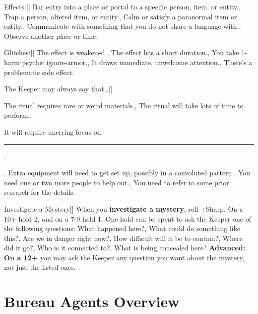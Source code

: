 \documentclass[10pt,oneside,landscape]{memoir}
\begin{document}
\begin{multicols}{3}
\begin{minipage}[t][0.75\textheight][t]{1\linewidth}
\begin{blurb*}{Effects:}[]
\holdoptions%
    {{Bar entry into a place or portal to a specific person, item, or entity.},
    {Trap a person, altered item, or entity.},
    {Calm or satisfy a paranormal item or entity.},
    {Communicate with something that you do not share a language with.},
    {Observe another place or time.}}
\end{blurb*}
\brln
%
\begin{blurb*}{Glitches:}[]%
\holdoptions%
    {{The effect is weakened.},
    {The effect has a short duration.},
    {You take 1-harm psychic ignore-armor.},
    {It draws immediate, unwelcome attention.},
    {There’s a problematic side effect.}}
\end{blurb*}
\brln
%
\begin{blurb*}{The Keeper may always say that…}[]%
\holdoptions%
    {{The ritual requires rare or weird materials.},
    {The ritual will take lots of time to perform.},
    {It will require unerring focus on \rule{0.315\linewidth}{0.4pt}.},
    {Extra equipment will need to get set up, possibly in a convoluted pattern.},
    {You need one or two more people to help out.},
    {You need to refer to some prior research for the details.}}
\end{blurb*}
\end{minipage}
%
\begin{minipage}[t][0.75\textheight][t]{1\linewidth}
\begin{pbsect}{Investigate a Mystery}[]
When you \textbf{investigate a mystery}, roll +Sharp. On a 10+ hold 2, and on a 7-9 hold 1. One hold can be spent to ask the Keeper one of the following questions:
\holdoptions%
    {What happened here?,
    What could do something like this?,
    Are we in danger right now?,
    How difficult will it be to contain?,
    Where did it go?,
    Who is it connected to?,
    What is being concealed here?}
\brln
\textbf{Advanced: On a 12+} you may ask the Keeper any question you want about the mystery, not just the listed ones.

\end{pbsect}
\end{minipage}

\end{multicols}
\pagebreak
\setlength\columnsep{8mm}

\chapter*{Bureau Agents Overview}
\end{document}
